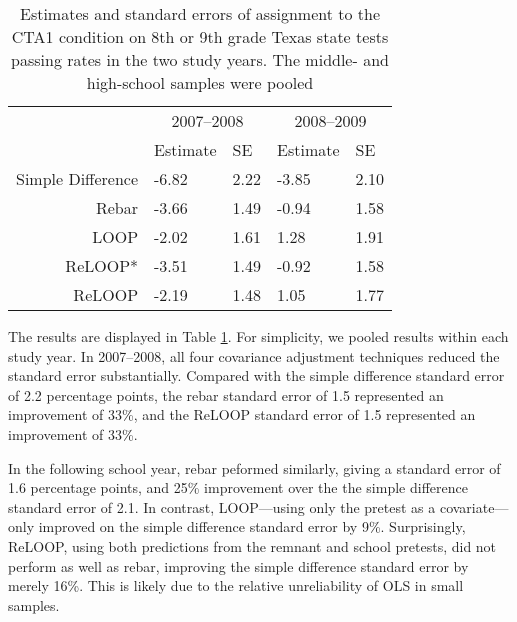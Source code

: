 \begin{table}[ht]
\centering
\begin{tabular}{rll|ll}
   &\multicolumn{2}{c}{2007--2008}&\multicolumn{2}{c}{2008--2009}\\ 
 &Estimate&SE&Estimate&SE\\ 
 \hline
Simple Difference & -6.82 & 2.22 & -3.85 & 2.10 \\ 
  Rebar & -3.66 & 1.49 & -0.94 & 1.58 \\ 
  LOOP & -2.02 & 1.61 & 1.28 & 1.91 \\ 
  ReLOOP* & -3.51 & 1.49 & -0.92 & 1.58 \\ 
  ReLOOP & -2.19 & 1.48 & 1.05 & 1.77 \\ 
   \hline
\end{tabular}
\caption{Estimates and standard errors of assignment to the CTA1 condition on 8th or 9th grade Texas state tests passing rates in the two study years. The middle- and high-school samples were pooled} 
\label{tab:resultsCT}
\end{table}


The results are displayed in Table \ref{tab:resultsCT}.
For simplicity, we pooled results within each study year.
In 2007--2008, all four covariance adjustment techniques reduced the
standard error substantially. Compared with the simple difference
standard error of 2.2 percentage points,
the rebar standard error of 1.5
represented an improvement of 33\%, and
the ReLOOP standard error of 1.5
represented an improvement of 33\%.

In the following school year, rebar peformed similarly, giving a
standard error of 1.6 percentage points, and
25\% improvement over the the simple
difference standard error of 2.1.
In contrast, LOOP---using only the pretest as a covariate---only
improved on the simple difference standard error by
9\%.
Surprisingly, ReLOOP, using both predictions from the remnant and
school pretests, did not perform as well as rebar, improving the
simple difference standard error by merely
16\%.
This is likely due to the relative unreliability of OLS in small samples.
